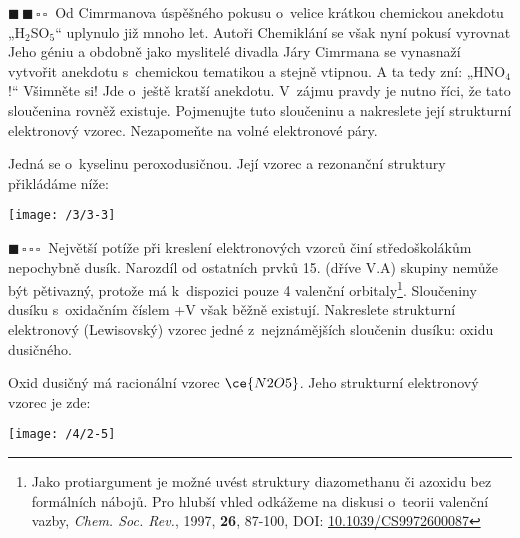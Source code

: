 \documentclass{book}
\newcommand{\jeden}{$\blacksquare \, \square \, \square \, \square \; \; $}
\newcommand{\dva}{$\blacksquare \, \blacksquare \, \square \, \square \; \; $}
\renewenvironment{quotation}{\par}{\par} %
\begin{document}
\begin{quotation}
\dva Od Cimrmanova úspěšného pokusu o~velice krátkou chemickou anekdotu
„H$_{2}$SO$_{5}$“ uplynulo již mnoho let. Autoři Chemiklání se však
nyní pokusí vyrovnat Jeho géniu a obdobně jako myslitelé divadla Járy
Cimrmana se vynasnaží vytvořit anekdotu s~chemickou tematikou a stejně
vtipnou. A ta tedy zní: „HNO$_{4}$!“ Všimněte si! Jde o~ještě kratší
anekdotu. V~zájmu pravdy je nutno říci, že tato sloučenina rovněž
existuje. Pojmenujte tuto sloučeninu a nakreslete její strukturní
elektronový vzorec. Nezapomeňte na volné elektronové páry. 
\end{quotation} \dotfill \par 
Jedná se o~kyselinu peroxodusičnou. Její vzorec a rezonanční struktury
přikládáme níže:
\noindent \begin{center}

\texttt{[image: /3/3-3]}

\par\end{center}

\hrulefill %
\begin{quotation}
\jeden Největší potíže při kreslení elektronových vzorců činí středoškolákům
nepochybně dusík. Narozdíl od ostatních prvků 15. (dříve V.A) skupiny
nemůže být pětivazný, protože má k~dispozici pouze 4 valenční orbitaly\footnote{Jako protiargument je možné uvést struktury diazomethanu či azoxidu bez formálních nábojů. Pro hlubší vhled odkážeme na diskusi o~teorii valenční vazby, 
\textit{Chem. Soc. Rev.}, 1997, \textbf{26}, 87-100, DOI: 
\href{https://doi.org/10.1039/CS9972600087}{\underline{10.1039/CS9972600087}}}.
Sloučeniny dusíku s~oxidačním číslem +V však běžně existují. Nakreslete strukturní elektronový (Lewisovský) vzorec jedné z~nejznámějších sloučenin dusíku: oxidu dusičného. 
\end{quotation} \dotfill \par 
Oxid dusičný má racionální vzorec $\ce{N2O5}$. Jeho strukturní elektronový
vzorec je zde:
\noindent \begin{center}

\texttt{[image: /4/2-5]}

\par\end{center}
\end{document}
